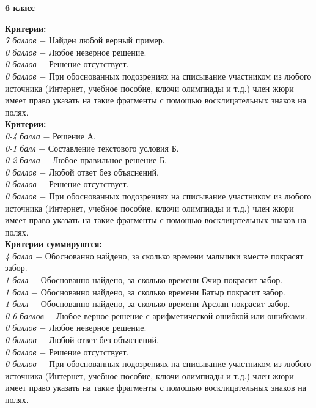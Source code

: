 \centerline{\bf \Huge 6 класс}

 \textbf{Критерии:} \\
\textit{7 баллов} $-$ Найден любой верный пример.\\
\textit{0 баллов} $-$ Любое неверное решение.\\
\textit{0 баллов} $-$ Решение отсутствует.\\
\textit{0 баллов} $-$ При обоснованных подозрениях на списывание участником из любого источника (Интернет, учебное пособие, ключи олимпиады и т.д.) член жюри имеет право указать на такие фрагменты с помощью восклицательных знаков на полях. \\


 \textbf{Критерии:} \\
\textit{0-4 балла} $-$ Решение А.\\
\textit{0-1 балл} $-$ Составление текстового условия Б.\\
\textit{0-2 балла} $-$ Любое правильное решение Б.\\
\textit{0 баллов} $-$ Любой ответ без объяснений.\\
\textit{0 баллов} $-$ Решение отсутствует.\\
\textit{0 баллов} $-$ При обоснованных подозрениях на списывание участником из любого источника (Интернет, учебное пособие, ключи олимпиады и т.д.) член жюри имеет право указать на такие фрагменты с помощью восклицательных знаков на полях. \\


 \textbf{Критерии суммируются:} \\
\textit{4 балла} $-$ Обоснованно найдено, за сколько времени мальчики вместе покрасят забор.\\
\textit{1 балл} $-$ Обоснованно найдено, за сколько времени Очир покрасит забор.\\
\textit{1 балл} $-$ Обоснованно найдено, за сколько времени Батыр покрасит забор.\\
\textit{1 балл} $-$ Обоснованно найдено, за сколько времени Арслан покрасит забор.\\
\textit{0-6 баллов} $-$ Любое верное решение с арифметической ошибкой или ошибками.\\
\textit{0 баллов} $-$ Любое неверное решение.\\
\textit{0 баллов} $-$ Любой ответ без объяснений.\\
\textit{0 баллов} $-$ Решение отсутствует.\\
\textit{0 баллов} $-$ При обоснованных подозрениях на списывание участником из любого источника (Интернет, учебное пособие, ключи олимпиады и т.д.) член жюри имеет право указать на такие фрагменты с помощью восклицательных знаков на полях. \\


